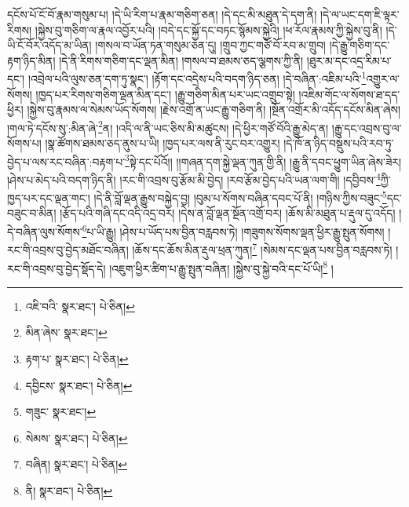 དངོས་པོ་ངོ་བོ་རྣམ་གསུམ་པ། །དེ་ཡི་རིག་པ་རྣམ་གཅིག་ཅན། །དེ་དང་མི་མཐུན་དེ་དག་ནི། །དེ་ལ་ཡང་དག་ཇི་ལྟར་རིགས། །སྐྱེས་བུ་གཅིག་ལ་རྣལ་འབྱོར་པའི། །བདེ་དང་སྐྱོ་དང་བཏང་སྙོམས་སྐྱེའི། །ཕ་རོལ་རྣམས་ཀྱི་སྐྱེས་བུ་ནི། །དེ་ཡི་ངོ་བོར་འདོད་མ་ཡིན། །གསལ་བ་ཡོན་ཏན་གསུམ་ཅན་དུ། །གྲུབ་ཀྱང་གཙོ་བོ་རབ་མ་གྲུབ། །དེ་རྒྱུ་གཅིག་དང་རྟག་ཉིད་མིན། །དེ་ནི་རིགས་གཅིག་དང་ལྡན་མིན། །གསལ་བ་ཐམས་ཅད་ལྕགས་ཀྱི་ནི། །ཐུར་མ་དང་འདྲ་རིམ་པ་དང་། །འབྲེལ་པའི་ལུས་ཅན་དག་ཏུ་སྣང་། །རྟོག་དང་འདྲེས་པའི་བདག་ཉིད་ཅན། །དེ་བཞིན་:འཇིམ་པའི་\footnote{འཇི་བའི་  སྣར་ཐང་།  པེ་ཅིན། }འགྱུར་ལ་སོགས། །ཁྱད་པར་རིགས་གཅིག་ལྡན་མིན་དང་། །རྒྱུ་གཅིག་མིན་པར་ཡང་འགྲུབ་སྟེ། །འཇིམ་གོང་ལ་སོགས་ཐ་དད་ཕྱིར། །སྐྱེས་བུ་རྣམས་ལ་སེམས་ཡོད་སོགས། །རྗེས་འགྲོ་ན་ཡང་རྒྱུ་གཅིག་ནི། །སྔོན་འགྲོར་མི་འདོད་དངོས་མིན་ཞེས། །གལ་ཏེ་དངོས་སུ་:མིན་ཞེ་\footnote{མིན་ཞེས་  སྣར་ཐང་། }ན། །འདི་ལ་ནི་ཡང་ཅིས་མི་མཚུངས། །དེ་ཕྱིར་གཙོ་བོའི་རྒྱུ་མེད་ན། །རྒྱུ་དང་འབྲས་བུ་ལ་སོགས་པ། །སྣ་ཚོགས་ཐམས་ཅད་ནུས་པ་ཡི། །ཁྱད་པར་ལས་ནི་རུང་བར་འགྱུར། །དེ་ཁོ་ན་ཉིད་བསྡུས་པའི་རབ་ཏུ་བྱེད་པ་ལས་རང་བཞིན་:བརྟག་པ་\footnote{རྟག་པ་  སྣར་ཐང་།  པེ་ཅིན། }སྟེ་དང་པོའོ།། །།གཞན་དག་སྐྱེ་ལྡན་ཀུན་གྱི་ནི། །རྒྱུ་ནི་དབང་ཕྱུག་ཡིན་ཞེས་ཟེར། །ཤེས་པ་མེད་པའི་བདག་ཉིད་ནི། །རང་གི་འབྲས་བུ་རྩོམ་མི་བྱེད། །རབ་རྩོམ་བྱེད་པའི་ཡན་ལག་གི། །དབྱིབས་\footnote{དབྱིངས་  སྣར་ཐང་།  པེ་ཅིན། }ཀྱི་ཁྱད་པར་དང་ལྡན་གང་། །དེ་ནི་བློ་ལྡན་རྒྱུས་བསྐྱེད་བྱ། །བུམ་པ་སོགས་བཞིན་དབང་པོ་ནི། །གཉིས་ཀྱིས་བཟུང་\footnote{གཟུང་  སྣར་ཐང་། }དང་བཟུང་བ་མིན། །རྩོད་པའི་གཞི་དང་འདི་འདྲ་བར། །དེས་ན་བློ་ལྡན་སྔོན་འགྲོ་བར། །ཆོས་མི་མཐུན་པ་རྡུལ་དུ་འདོད། །དེ་བཞིན་ལུས་སོགས་\footnote{སེམས་  སྣར་ཐང་།  པེ་ཅིན། }པ་ཡི་རྒྱུ། །ཤེས་པ་ཡོད་པས་བྱིན་བརླབས་ཏེ། །གཟུགས་སོགས་ལྡན་ཕྱིར་རྒྱུ་སྤུན་སོགས། །རང་གི་འབྲས་བུ་བྱེད་མཐོང་བཞིན། །ཆོས་དང་ཆོས་མིན་རྡུལ་ཕྲན་ཀུན།\footnote{བཞིན།  སྣར་ཐང་།  པེ་ཅིན། } །སེམས་དང་ལྡན་པས་བྱིན་བརླབས་ཏེ། །རང་གི་འབྲས་བུ་བྱེད་སྡོད་དེ། །འཇུག་ཕྱིར་ཚིག་པ་རྒྱུ་སྤུན་བཞིན། །སྐྱེས་བུ་སྐྱེ་བའི་དང་པོ་ཡི།\footnote{ནི།  སྣར་ཐང་།  པེ་ཅིན། } །
